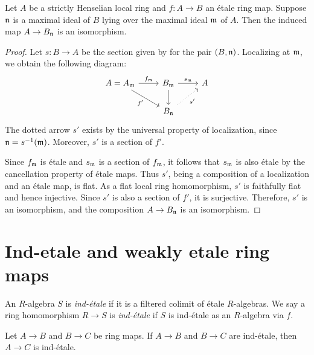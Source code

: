 \begin{proposition}
    \label{thm:etale-over-strictly-henselian-localization-isom}
    Let \(A\) be a strictly Henselian local ring and \(f : A \to B\) an étale ring map. Suppose \({\mathfrak{n}}\) is a maximal ideal of \(B\) lying over the maximal ideal \({\mathfrak{m}}\) of \(A\). Then the induced map \(A \to B_{\mathfrak{n}}\) is an isomorphism.
\end{proposition}

\begin{proof}
  Let \(s: B \to A\) be the section given by  for the pair \((B, {\mathfrak{n}})\). Localizing at \({\mathfrak{m}}\), we obtain the following diagram:
  \[
  \begin{tikzcd}
    A = A_\m \arrow[r, "f_\m"]\arrow[dr, "f'"'] & B_\m \arrow[d] \arrow[r, "s_\m"] & A \\
    & B_\n \arrow[ur, dotted, "s'"'] &
  \end{tikzcd}
  \]
  The dotted arrow \(s'\) exists by the universal property of localization, since \({\mathfrak{n}} = s^{-1}({\mathfrak{m}})\). Moreover, \(s'\) is a section of \(f'\).

  Since \(f_{\mathfrak{m}}\) is étale and \(s_{\mathfrak{m}}\) is a section of \(f_{\mathfrak{m}}\), it follows that \(s_{\mathfrak{m}}\) is also étale by the cancellation property of étale maps. Thus \(s'\), being a composition of a localization and an étale map, is flat. As a flat local ring homomorphism, \(s'\) is faithfully flat and hence injective. Since \(s'\) is also a section of \(f'\), it is surjective. Therefore, \(s'\) is an isomorphism, and the composition \(A \to B_{\mathfrak{n}}\) is an isomorphism.
\end{proof}

\section{Ind-etale and weakly etale ring maps}

\begin{definition}
    An $R$-algebra $S$ is \emph{ind-étale} if it is a filtered colimit of étale $R$-algebras.
    We say a ring homomorphism $R \to S$ is \emph{ind-étale} if $S$ is ind-étale as an $R$-algebra via $f$.
    \label{def:ind-etale}
    \leanok
\end{definition}

\begin{lemma}
  \label{thm:ind-etale-comp}
  Let $A \to B$ and $B \to C$ be ring maps. If $A \to B$ and $B \to C$ are ind-étale, then $A \to C$ is ind-étale.
\end{lemma}

